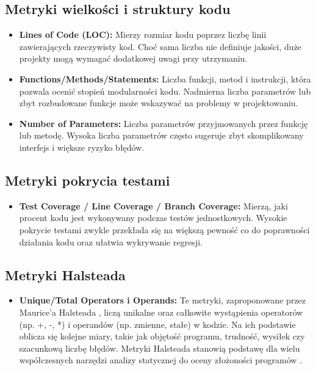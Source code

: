 \documentclass[a4paper,12pt]{article}
\begin{document}
\subsection{Metryki wielkości i struktury kodu}
\begin{itemize} \item \textbf{Lines of Code (LOC):} Mierzy rozmiar kodu poprzez liczbę linii zawierających rzeczywisty kod. Choć sama liczba nie definiuje jakości, duże projekty mogą wymagać dodatkowej uwagi przy utrzymaniu. \item \textbf{Functions/Methods/Statements:} Liczba funkcji, metod i instrukcji, która pozwala ocenić stopień modularności kodu. Nadmierna liczba parametrów lub zbyt rozbudowane funkcje może wskazywać na problemy w projektowaniu. \item \textbf{Number of Parameters:} Liczba parametrów przyjmowanych przez funkcję lub metodę. Wysoka liczba parametrów często sugeruje zbyt skomplikowany interfejs i większe ryzyko błędów. \end{itemize}
\subsection{Metryki pokrycia testami}
\begin{itemize} \item \textbf{Test Coverage / Line Coverage / Branch Coverage:} Mierzą, jaki procent kodu jest wykonywany podczas testów jednostkowych. Wysokie pokrycie testami zwykle przekłada się na większą pewność co do poprawności działania kodu oraz ułatwia wykrywanie regresji. \end{itemize}
\subsection{Metryki Halsteada}
\begin{itemize} 
\item \textbf{Unique/Total Operators i Operands:} Te metryki, zaproponowane przez Maurice'a Halsteada \cite{halstead1977elements}, liczą unikalne oraz całkowite wystąpienia operatorów (np. +, -, *) i operandów (np. zmienne, stałe) w kodzie. Na ich podstawie oblicza się kolejne miary, takie jak objętość programu, trudność, wysiłek czy szacunkową liczbę błędów. Metryki Halsteada stanowią podstawę dla wielu współczesnych narzędzi analizy statycznej do oceny złożoności programów \cite{fenton2014software}.
\end{itemize}
\end{document}
